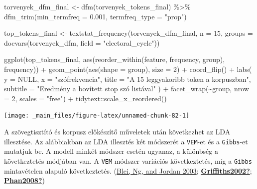 \documentclass[
]{book}
\newenvironment{Shaded}{\begin{snugshade}}{\end{snugshade}}
\newcommand{\AttributeTok}[1]{\textcolor[rgb]{0.77,0.63,0.00}{#1}}
\newcommand{\ConstantTok}[1]{\textcolor[rgb]{0.00,0.00,0.00}{#1}}
\newcommand{\DecValTok}[1]{\textcolor[rgb]{0.00,0.00,0.81}{#1}}
\newcommand{\FloatTok}[1]{\textcolor[rgb]{0.00,0.00,0.81}{#1}}
\newcommand{\FunctionTok}[1]{\textcolor[rgb]{0.00,0.00,0.00}{#1}}
\newcommand{\NormalTok}[1]{#1}
\newcommand{\OtherTok}[1]{\textcolor[rgb]{0.56,0.35,0.01}{#1}}
\newcommand{\SpecialCharTok}[1]{\textcolor[rgb]{0.00,0.00,0.00}{#1}}
\newcommand{\StringTok}[1]{\textcolor[rgb]{0.31,0.60,0.02}{#1}}
\begin{document}
\begin{Shaded}
\begin{Highlighting}[]
\NormalTok{torvenyek\_dfm\_final }\OtherTok{\textless{}{-}} \FunctionTok{dfm}\NormalTok{(torvenyek\_tokens\_final) }\SpecialCharTok{\%\textgreater{}\%}
  \FunctionTok{dfm\_trim}\NormalTok{(}\AttributeTok{min\_termfreq =} \FloatTok{0.001}\NormalTok{, }\AttributeTok{termfreq\_type =} \StringTok{"prop"}\NormalTok{)}

\NormalTok{top\_tokens\_final }\OtherTok{\textless{}{-}} \FunctionTok{textstat\_frequency}\NormalTok{(torvenyek\_dfm\_final, }\AttributeTok{n =} \DecValTok{15}\NormalTok{, }\AttributeTok{groups =} \FunctionTok{docvars}\NormalTok{(torvenyek\_dfm, }\AttributeTok{field =} \StringTok{"electoral\_cycle"}\NormalTok{))}

\FunctionTok{ggplot}\NormalTok{(top\_tokens\_final, }\FunctionTok{aes}\NormalTok{(}\FunctionTok{reorder\_within}\NormalTok{(feature, frequency, group), frequency)) }\SpecialCharTok{+}
  \FunctionTok{geom\_point}\NormalTok{(}\FunctionTok{aes}\NormalTok{(}\AttributeTok{shape =}\NormalTok{ group), }\AttributeTok{size =} \DecValTok{2}\NormalTok{) }\SpecialCharTok{+}
  \FunctionTok{coord\_flip}\NormalTok{() }\SpecialCharTok{+}
  \FunctionTok{labs}\NormalTok{(}
    \AttributeTok{y =} \ConstantTok{NULL}\NormalTok{,}
    \AttributeTok{x =} \StringTok{"szófrekvencia"}\NormalTok{,}
    \AttributeTok{title =} \StringTok{"A 15 leggyakoribb token a korpuszban"}\NormalTok{,}
    \AttributeTok{subtitle =} \StringTok{"Eredmény a bovített stop szó listával"}
\NormalTok{  ) }\SpecialCharTok{+}
  \FunctionTok{facet\_wrap}\NormalTok{(}\SpecialCharTok{\textasciitilde{}}\NormalTok{group, }\AttributeTok{nrow =} \DecValTok{2}\NormalTok{, }\AttributeTok{scales =} \StringTok{"free"}\NormalTok{) }\SpecialCharTok{+}
\NormalTok{  tidytext}\SpecialCharTok{::}\FunctionTok{scale\_x\_reordered}\NormalTok{()}
\end{Highlighting}
\end{Shaded}

\begin{center}\texttt{[image: \_main\_files/figure-latex/unnamed-chunk-82-1]} \end{center}

A szövegtisztító és korpusz előkészítő műveletek után következhet az LDA
illesztése. Az alábbiakban az LDA illesztés két módszerét a
\texttt{VEM}-et és a \texttt{Gibbs}-et mutatjuk be. A modell minkét
módszer esetén ugyanaz, a különbség a következtetés módjában van. A
\texttt{VEM} módszer variációs következtetés, míg a \texttt{Gibbs}
mintavételen alapuló következtetés.
(\protect\hyperlink{ref-blei2003}{Blei, Ng, and Jordan 2003};
\protect\hyperlink{ref-Griffiths2002}{\textbf{Griffiths2002?}};
\protect\hyperlink{ref-Phan2008}{\textbf{Phan2008?}})
\end{document}
